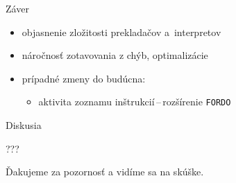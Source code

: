 \documentclass[pdf,fyma2,total]{prosper}
\begin{document}

\begin{slide}{Záver}
\begin{small}
    \bigskip
    \begin{itemize}
        \item{objasnenie zložitosti prekladačov a~interpretov}
        \medskip
        \item{náročnosť zotavovania z chýb, optimalizácie}
        \medskip
        \item{prípadné zmeny do budúcna:}
        \begin{itemize}
            \medskip
            \item{aktivita zoznamu inštrukcií\,--\,rozšírenie \texttt{FORDO}}
        \end{itemize}
    \end{itemize}
\end{small}
\end{slide}


\begin{slide}{Diskusia}
    \begin{center}
            \bigskip
            \bigskip
            \bigskip
            \bigskip
            \bigskip
            \bigskip
            {\Large ?}{\Huge ?}{\Large ?}
            \bigskip
            \bigskip
            \bigskip
            \bigskip
            \bigskip
            \bigskip
            \bigskip
            \bigskip
    \end{center}

    \begin{flushright}
        Ďakujeme za pozornosť a vidíme sa na skúške.
    \end{flushright}
\end{slide}

\end{document}
